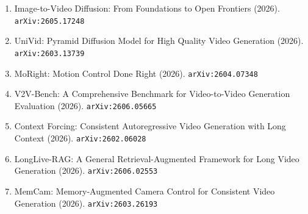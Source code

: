 \documentclass[11pt]{article}
\begin{document}
\begin{enumerate}
  \item Image-to-Video Diffusion: From Foundations to Open Frontiers (2026). \texttt{arXiv:2605.17248}
  \item UniVid: Pyramid Diffusion Model for High Quality Video Generation (2026). \texttt{arXiv:2603.13739}
  \item MoRight: Motion Control Done Right (2026). \texttt{arXiv:2604.07348}
  \item V2V-Bench: A Comprehensive Benchmark for Video-to-Video Generation Evaluation (2026). \texttt{arXiv:2606.05665}
  \item Context Forcing: Consistent Autoregressive Video Generation with Long Context (2026). \texttt{arXiv:2602.06028}
  \item LongLive-RAG: A General Retrieval-Augmented Framework for Long Video Generation (2026). \texttt{arXiv:2606.02553}
  \item MemCam: Memory-Augmented Camera Control for Consistent Video Generation (2026). \texttt{arXiv:2603.26193}
\end{enumerate}
\end{document}
